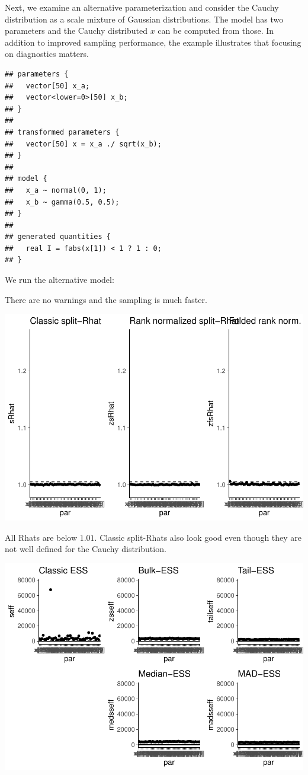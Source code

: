 \documentclass[american,]{article}
\begin{document}
Next, we examine an alternative parameterization and consider the Cauchy
distribution as a scale mixture of Gaussian distributions. The model has
two parameters and the Cauchy distributed \(x\) can be computed from
those. In addition to improved sampling performance, the example
illustrates that focusing on diagnostics matters.

\begin{verbatim}
## parameters {
##   vector[50] x_a;
##   vector<lower=0>[50] x_b;
## }
## 
## transformed parameters {
##   vector[50] x = x_a ./ sqrt(x_b);
## }
## 
## model {
##   x_a ~ normal(0, 1);
##   x_b ~ gamma(0.5, 0.5);
## }
## 
## generated quantities {
##   real I = fabs(x[1]) < 1 ? 1 : 0;
## }
\end{verbatim}

We run the alternative model:

There are no warnings and the sampling is much faster.

\includegraphics{graphics/rhat-fit-alt1-1.pdf}

All Rhats are below \(1.01\). Classic split-Rhats also look good even
though they are not well defined for the Cauchy distribution.

\includegraphics{graphics/ess-fit-alt1-1.pdf}
\end{document}
